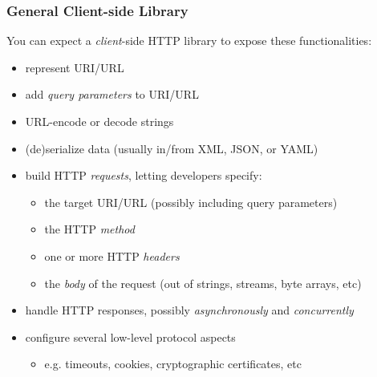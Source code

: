 \documentclass[presentation]{beamer}\mode<presentation>{\usetheme{AMSBolognaFC}}
\begin{document}
\begin{frame}%
\frametitle{General Client-side Library}

    You can expect a \emph{client}-side HTTP library to expose these functionalities:
    \begin{itemize}
        \item represent URI/URL

        \vfill

        \item add \emph{query parameters} to URI/URL

        \vfill

        \item URL-encode or decode strings

        \vfill

        \item (de)serialize data (usually in/from XML, \alert{JSON}, or YAML)

        \vfill

        \item build HTTP \emph{requests}, letting developers specify:
        \begin{itemize}
            \item the target URI/URL (possibly including query parameters)
            \item the HTTP \emph{method}
            \item one or more HTTP \emph{headers}
            \item the \emph{body} of the request (out of strings, streams, byte arrays, etc)
        \end{itemize}

        \vfill

        \item handle HTTP responses, possibly \emph{asynchronously} and \emph{concurrently}

        \vfill

        \item configure several low-level protocol aspects
        \begin{itemize}
            \item e.g. timeouts, cookies, cryptographic certificates, etc
        \end{itemize}
    \end{itemize}
\end{frame}
\end{document}
